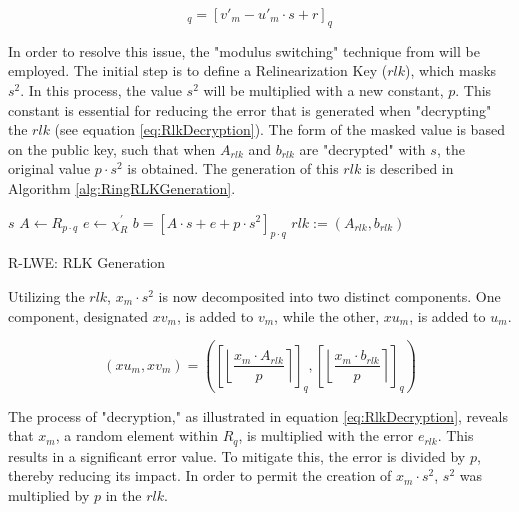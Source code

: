 \begin{equation}
  [v_m - u_m\cdot s + x_m \cdot s^2]_q = [v'_m - u'_m\cdot s + r]_q
  \label{eq:relinFormalized}
\end{equation}

In order to resolve this issue, the "modulus switching" technique from \cite{bfv} will be employed. The initial step is to define a Relinearization Key ($rlk$), which masks $s^2$. In this process, the value $s^2$ will be multiplied with a new constant, $p$. This constant is essential for reducing the error that is generated when "decrypting" the $rlk$ (see equation \ref{eq:RlkDecryption}).
The form of the masked value is based on the public key, such that when $A_{rlk}$ and $b_{rlk}$ are "decrypted" with $s$, the original value $p\cdot s^2$ is obtained. The generation of this $rlk$ is described in Algorithm \ref{alg:RingRLKGeneration}.

\begin{algorithm}[htb]
  \begin{algorithmic}[1]
    \REQUIRE $s$
    \STATE $A \leftarrow R_{p \cdot q}$
    \STATE $e \leftarrow \chi_R^{'}$
    \STATE $b = [A\cdot s+e+p\cdot s^2]_{p \cdot q}$
    \RETURN $rlk:=(A_{rlk}, b_{rlk})$
  \end{algorithmic}
  \caption{R-LWE: RLK Generation}
  \label{alg:RingRLKGeneration}
\end{algorithm}

Utilizing the $rlk$, $x_m\cdot s^2$ is now decomposited into two distinct components. One component, designated $xv_m$, is added to $v_m$, while the other, $xu_m$, is added to $u_m$.

\begin{equation}
  (xu_m, xv_m) = \left(\left[\left\lfloor \frac{x_m \cdot A_{rlk}}{p}  \right\rceil \right]_q, \left[\left\lfloor \frac{x_m \cdot b_{rlk}}{p}  \right\rceil \right]_q\right)
  \label{eq:ringXmSplitting}
\end{equation}

The process of "decryption," as illustrated in equation \ref{eq:RlkDecryption}, reveals that $x_m$, a random element within $R_q$, is multiplied with the error $e_{rlk}$. This results in a significant error value. To mitigate this, the error is divided by $p$, thereby reducing its impact. In order to permit the creation of $x_m \cdot s^2$, $s^2$ was multiplied by $p$ in the $rlk$.


